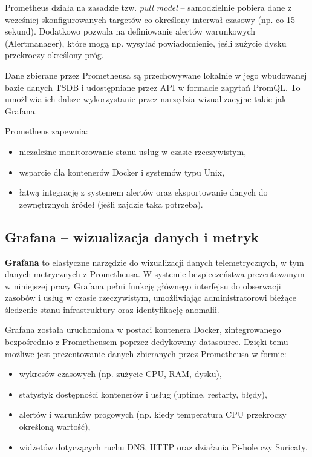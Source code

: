 \documentclass[
    left=2.5cm,         %
    right=2.5cm,        %
    top=2.5cm,          %
    bottom=3cm,         %
    bindingoffset=6mm,  %
    nohyphenation=true %
]{eiti/eiti-thesis} %
\begin{document}
Prometheus działa na zasadzie tzw. \textit{pull model} – samodzielnie pobiera dane z wcześniej skonfigurowanych targetów co określony interwał czasowy (np. co 15 sekund). Dodatkowo pozwala na definiowanie alertów warunkowych (Alertmanager), które mogą np. wysyłać powiadomienie, jeśli zużycie dysku przekroczy określony próg.

Dane zbierane przez Prometheusa są przechowywane lokalnie w jego wbudowanej bazie danych TSDB i udostępniane przez API w formacie zapytań PromQL. To umożliwia ich dalsze wykorzystanie przez narzędzia wizualizacyjne takie jak Grafana.

Prometheus zapewnia:
\begin{itemize}
    \item niezależne monitorowanie stanu usług w czasie rzeczywistym,
    \item wsparcie dla kontenerów Docker i systemów typu Unix,
    \item łatwą integrację z systemem alertów oraz eksportowanie danych do zewnętrznych źródeł (jeśli zajdzie taka potrzeba).
\end{itemize}

\subsection{Grafana – wizualizacja danych i metryk}

\textbf{Grafana}\cite{grafana-docs} to elastyczne narzędzie do wizualizacji danych telemetrycznych, w tym danych metrycznych z Prometheusa. W systemie bezpieczeństwa prezentowanym w niniejszej pracy Grafana pełni funkcję głównego interfejsu do obserwacji zasobów i usług w czasie rzeczywistym, umożliwiając administratorowi bieżące śledzenie stanu infrastruktury oraz identyfikację anomalii.

Grafana została uruchomiona w postaci kontenera Docker, zintegrowanego bezpośrednio z Prometheusem poprzez dedykowany datasource. Dzięki temu możliwe jest prezentowanie danych zbieranych przez Prometheusa w formie:
\begin{itemize}
    \item wykresów czasowych (np. zużycie CPU, RAM, dysku),
    \item statystyk dostępności kontenerów i usług (uptime, restarty, błędy),
    \item alertów i warunków progowych (np. kiedy temperatura CPU przekroczy określoną wartość),
    \item widżetów dotyczących ruchu DNS, HTTP oraz działania Pi-hole czy Suricaty.
\end{itemize}
\end{document}
